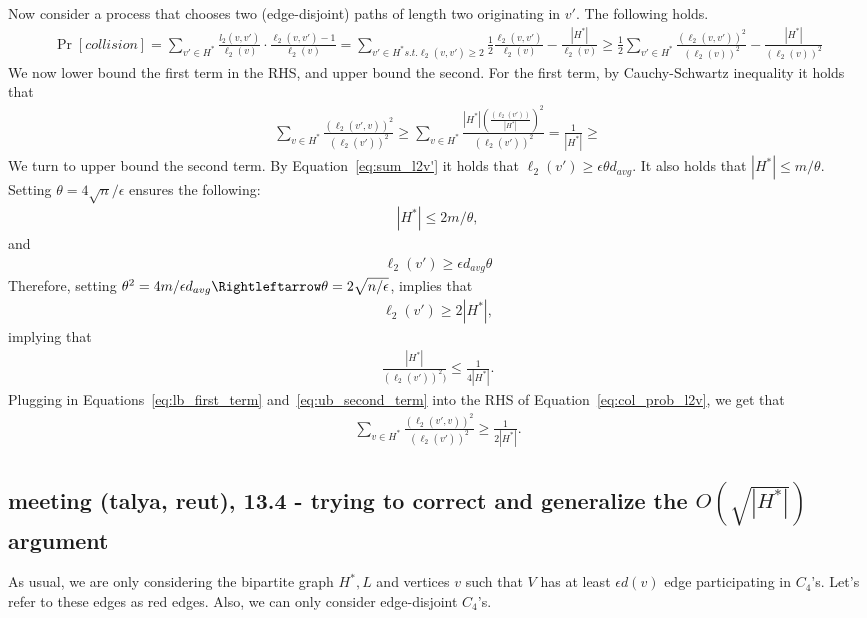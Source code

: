 \documentclass{article}
\newcommand{\eps}{\epsilon}
\newcommand{\davg}{d_{avg}}
\begin{document}
Now consider a process that chooses two (edge-disjoint) paths of length two originating in $v'$.
The following holds.
\begin{align} \label{eq:col_prob_l2v}
\Pr[collision] =\sum_{v'\in H^*}\frac{l_2(v,v')}{\ell_2(v)}\cdot \frac{\ell_2(v,v')-1}{\ell_2(v)}=
\sum_{v'\in H^* s.t. {\ell_2(v,v')\geq 2}}\frac{1}{2}\frac{\ell_2(v,v')}{\ell_2(v)}-\frac{|H^*|}{\ell_2(v)}
\geq
\frac{1}{2}\sum_{v'\in H^*}\frac{(\ell_2(v,v'))^2}{(\ell_2(v))^2}-\frac{|H^*|}{(\ell_2(v))^2}
\end{align}
We now lower bound the first term in the RHS, and upper bound the second.
For the first term, by  Cauchy-Schwartz inequality it holds that
\begin{align}\label{eq:lb_first_term}
    \sum_{v\in H^*}\frac{(\ell_2(v',v))^2}{(\ell_2(v'))^2} \geq \sum_{v\in H^*}\frac{|H^*|\left(\frac{(\ell_2(v'))}{|H^*|}\right)^2}{(\ell_2(v'))^2}=\frac{1}{|H^*|}\geq
\end{align}
We turn to upper bound the second term.
By Equation~\ref{eq:sum_l2v'} it holds that $\ell_2(v')\geq \eps \theta \davg$. It also holds that $|H^*|\leq m/\theta$.
Setting $\theta=4\sqrt n/\eps$ ensures the following:
\begin{align}
    |H^*|\leq 2m/\theta,
\end{align}
and
\begin{align}
    \ell_2(v')\geq \eps \davg\theta
\end{align}
Therefore, setting $\theta^2 =4m/\eps\davg \Rightleftarrow \theta=2\sqrt{n/\eps}$, implies that
\begin{align}
    \ell_2(v')\geq 2|H^*|,
\end{align}
implying that
\begin{align}\label{eq:ub_second_term}
    \frac{|H^*|}{(\ell_2(v'))^2)} \leq \frac{1}{4|H^*|}.
\end{align}
Plugging in Equations~\eqref{eq:lb_first_term} and~\eqref{eq:ub_second_term} into the RHS of Equation~\ref{eq:col_prob_l2v}, we get that
\begin{align}
    \sum_{v\in H^*}\frac{(\ell_2(v',v))^2}{(\ell_2(v'))^2} \geq \frac{1}{2|H^*|}.
\end{align}

\subsection{meeting (talya, reut), 13.4 - trying to correct and generalize the $O(\sqrt{|H^*|})$ argument}

As usual, we are only considering the bipartite graph $H^*, L$ and vertices $v$ such that $V$ has at  least $\eps d(v)$ edge participating in $C_4$'s. Let's refer to these edges as red edges. Also, we can only consider edge-disjoint $C_4$'s.
\end{document}
